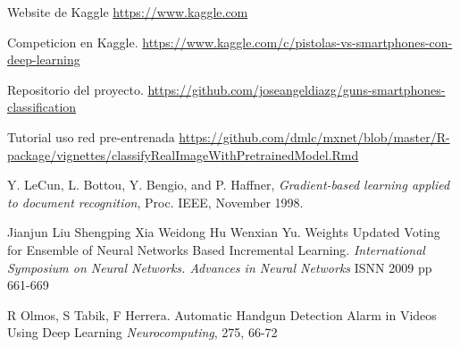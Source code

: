 % 

\begin{thebibliography}{99}


	\emph{} Website de Kaggle \url{https://www.kaggle.com}	

	\emph{} Competicion en Kaggle. \url{https://www.kaggle.com/c/pistolas-vs-smartphones-con-deep-learning}

	\emph{} Repositorio del proyecto. \url{https://github.com/joseangeldiazg/guns-smartphones-classification}	

	\emph{} Tutorial uso red pre-entrenada \url{https://github.com/dmlc/mxnet/blob/master/R-package/vignettes/classifyRealImageWithPretrainedModel.Rmd}
		
	
	\emph{}Y. LeCun, L. Bottou, Y. Bengio, and P. Haffner, \textit{Gradient-based learning applied to document recognition}, Proc. IEEE, November 1998.	
	
	\emph{} Jianjun Liu Shengping Xia Weidong Hu Wenxian Yu. Weights Updated Voting for Ensemble of Neural Networks Based Incremental Learning. \textit{International Symposium on Neural Networks. Advances in Neural Networks} ISNN 2009 pp 661-669
	
	\emph{}R Olmos, S Tabik, F Herrera. Automatic Handgun Detection Alarm in Videos Using Deep Learning  \textit{Neurocomputing}, 275, 66-72
	
\end{thebibliography}
